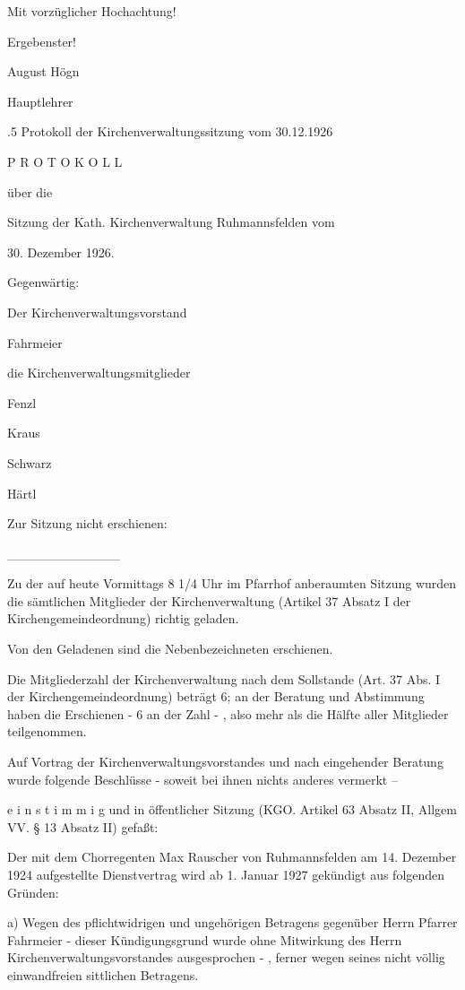     Mit vorzüglicher Hochachtung!

        Ergebenster!

            August Högn

                Hauptlehrer

.5 Protokoll der Kirchenverwaltungssitzung vom 30.12.1926

P R O T O K O L L

über die

Sitzung der Kath. Kirchenverwaltung Ruhmannsfelden vom

30. Dezember 1926.



Gegenwärtig:

Der Kirchenverwaltungsvorstand

Fahrmeier

die Kirchenverwaltungsmitglieder

Fenzl

Kraus

Schwarz

Härtl

Zur Sitzung nicht erschienen:

____________

Zu der auf heute Vormittags 8 1/4 Uhr im Pfarrhof anberaumten Sitzung wurden die
sämtlichen Mitglieder der Kirchenverwaltung (Artikel 37 Absatz I der
Kirchengemeindeordnung) richtig geladen.

Von den Geladenen sind die Nebenbezeichneten erschienen.

Die Mitgliederzahl der Kirchenverwaltung nach dem Sollstande (Art. 37 Abs. I der
Kirchengemeindeordnung) beträgt 6; an der Beratung und Abstimmung haben die
Erschienen - 6 an der Zahl - , also mehr als die Hälfte aller Mitglieder
teilgenommen.

Auf Vortrag der Kirchenverwaltungsvorstandes und nach eingehender Beratung wurde
folgende Beschlüsse - soweit bei ihnen nichts anderes vermerkt –

e i n s t i m m i g und in öffentlicher Sitzung (KGO. Artikel 63 Absatz II,
Allgem VV. § 13 Absatz II) gefaßt:



Der mit dem Chorregenten Max Rauscher von Ruhmannsfelden am 14. Dezember 1924
aufgestellte Dienstvertrag wird ab 1. Januar 1927 gekündigt aus folgenden
Gründen:

a) Wegen des pflichtwidrigen und ungehörigen Betragens gegenüber Herrn Pfarrer
Fahrmeier - dieser  Kündigungsgrund wurde ohne Mitwirkung des Herrn
Kirchenverwaltungsvorstandes ausgesprochen - , ferner wegen seines nicht völlig
einwandfreien sittlichen Betragens.


